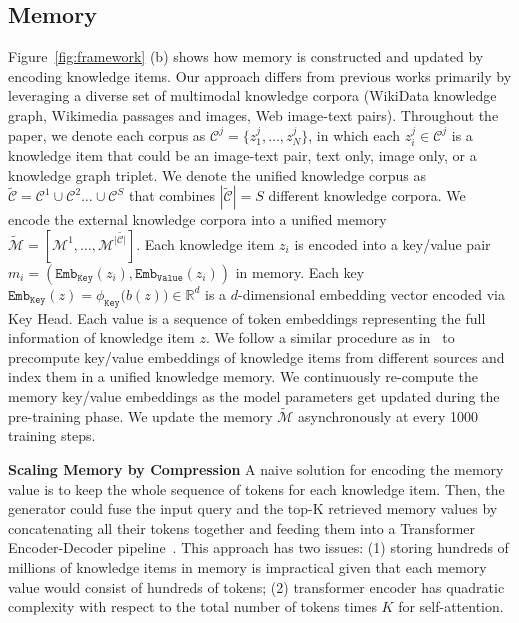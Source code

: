 \documentclass[10pt,twocolumn,letterpaper]{article}
\begin{document}
\subsection{Memory} \label{sec:memory}
Figure~\ref{fig:framework} (b) shows how memory is constructed and updated by encoding knowledge items.
Our approach differs from previous works primarily by leveraging a diverse set of multimodal knowledge corpora (WikiData knowledge graph, Wikimedia passages and images, Web image-text pairs). Throughout the paper, we denote each corpus as $\mathcal{C}^j = \{z^j_1, \dots, z^j_N\}$, in which each $z^j_i \in \mathcal{C}^j$ is a knowledge item that could be an image-text pair, text only, image only, or a knowledge graph triplet. We denote the unified knowledge corpus as $\tilde{\mathcal{C}} = \mathcal{C}^1 \cup \mathcal{C}^2 \dots \cup \mathcal{C}^S$ that combines $|\tilde{\mathcal{C}}|=S$ different knowledge corpora. 
We encode the external knowledge corpora into a unified memory $\tilde{\mathcal{M}}=[\mathcal{M}^1, \dots, \mathcal{M}^{|\tilde{\mathcal{C}|}}]$. Each knowledge item $z_i$ is encoded into a key/value pair $m_i=(\texttt{Emb}_{\texttt{Key}}(z_i),\texttt{Emb}_{\texttt{Value}}(z_i))$ in memory.  Each key
$\texttt{Emb}_{\texttt{Key}}(z)= \phi_{\texttt{Key}}\big(b(z)\big) \in \mathbb{R}^{d}$
is a $d$-dimensional embedding vector encoded via Key Head. 
Each value is a sequence of token embeddings representing the full information of knowledge item $z$.
We follow a similar procedure as in~\cite{DBLP:journals/corr/abs-2002-08909} to precompute key/value embeddings of knowledge items from different sources and index them in a unified knowledge memory.
We continuously re-compute the memory key/value embeddings as the model parameters get updated during the pre-training phase. We update the memory $\tilde{\mathcal{M}}$ asynchronously at every 1000 training steps.

\textbf{Scaling Memory by Compression}
A naive solution for encoding the memory value is to keep the whole sequence of tokens for each knowledge item. Then, the generator could fuse the input query and the top-K retrieved memory values by concatenating all their tokens together and feeding them into a Transformer Encoder-Decoder pipeline~\cite{DBLP:conf/nips/LewisPPPKGKLYR020}. This approach has two issues: (1) storing hundreds of millions of knowledge items in memory is impractical given that each memory value would consist of hundreds of tokens; (2) transformer encoder has quadratic complexity with respect to the total number of tokens times $K$ for self-attention. 
\end{document}
